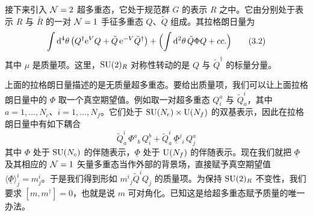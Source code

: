 
接下来引入 $\mathcal{N}=2$ 超多重态，它处于规范群 $G$ 的表示 $R$ 之中。它由分别处于表示 $R$ 与 $\bar R$ 的一对 $\mathcal{N}=1$ 手征多重态 $Q$、$\tilde Q$ 组成。其拉格朗日量为
\begin{equation}
  \int \mathrm{d}^4\theta\,\bigl(Q^\dagger \mathrm{e}^{V} Q + \tilde Q\, \mathrm{e}^{-V}\tilde Q^\dagger\bigr)
  + \Bigl(\int \mathrm{d}^2\theta\, \tilde Q\Phi Q + cc.\Bigr)
  \tag{3.2}
\end{equation}
其中 $\mu$ 是质量项。这里，$\mathrm{SU}(2)_R$ 对称性转动的是 $Q$ 与 $\tilde Q^\dagger$ 的标量分量。



上面的拉格朗日量描述的是无质量超多重态。要给出质量项，我们可以让上面拉格朗日量中的 $\Phi$ 取一个真空期望值。例如取一对超多重态 $Q^a_i$ 与 $\tilde Q^i_a$，其中 $a=1,\dots,N_c$、$i=1,\dots,N_f$。它们处于 $\mathrm{SU}(N_c)\times\mathrm{U}(N_f)$ 的双基表示，因此在拉格朗日量中有如下耦合
\begin{equation}
  \tilde Q^i_a\, \Phi^a{}_b\, Q^b_i
  + \tilde Q^i_a\, \underline{\Phi}^j{}_i\, Q^a_j
  \tag{3.3}
\end{equation}
其中 $\Phi$ 处于 $\mathrm{SU}(N_c)$ 的伴随表示，$\underline{\Phi}$ 处于 $\mathrm{U}(N_f)$ 的伴随表示。现在我们就把 $\underline{\Phi}$ 及其相应的 $\mathcal{N}=1$ 矢量多重态当作外部的背景场，直接赋予真空期望值 $\langle\underline{\Phi}\rangle^i_j = m^i_j$。于是我们得到形如 $m^i{}_j\tilde Q^i Q_j$ 的质量项。为保持 $\mathrm{SU}(2)_R$ 不变性，我们要求 $[m,m^\dagger]=0$，也就是说 $m$ 可对角化。已知这是给超多重态赋予质量的唯一办法。


